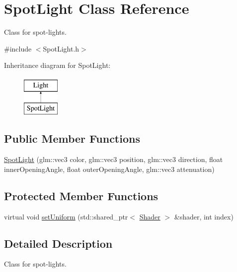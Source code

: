 \hypertarget{class_spot_light}{}\section{Spot\+Light Class Reference}
\label{class_spot_light}


Class for spot-\/lights.  




{\ttfamily \#include $<$Spot\+Light.\+h$>$}

Inheritance diagram for Spot\+Light\+:\begin{figure}[H]
\begin{center}
\leavevmode
\includegraphics[height=2.000000cm]{class_spot_light}
\end{center}
\end{figure}
\subsection*{Public Member Functions}
\begin{DoxyCompactItemize}
\item 
\mbox{\hyperlink{class_spot_light_a308ab1c137899599cb4c30d193c480ab}{Spot\+Light}} (glm\+::vec3 color, glm\+::vec3 position, glm\+::vec3 direction, float inner\+Opening\+Angle, float outer\+Opening\+Angle, glm\+::vec3 attenuation)
\end{DoxyCompactItemize}
\subsection*{Protected Member Functions}
\begin{DoxyCompactItemize}
\item 
virtual void \mbox{\hyperlink{class_spot_light_a7712847acb6f2d61b4c20968cd8ff461}{set\+Uniform}} (std\+::shared\+\_\+ptr$<$ \mbox{\hyperlink{class_shader}{Shader}} $>$ \&shader, int index)
\end{DoxyCompactItemize}


\subsection{Detailed Description}
Class for spot-\/lights. 



